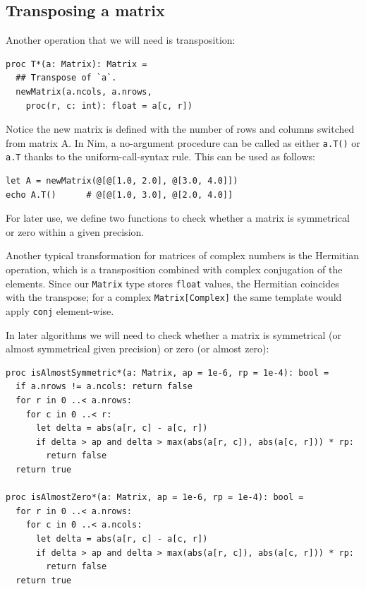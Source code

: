 \documentclass[justified, sixbynine]{tufte-book}
\def\ft{\small\tt}
\theoremstyle{plain}%
\newtheorem * {corollary}{Corollary}
\theoremstyle{definition}
\theoremstyle{remark}
\newtheorem * {remark}{Remark}
\newtheorem * {note}{Note}
\begin{document}
\begin{fullwidth}
\goodbreak\subsection{Transposing a matrix}


Another operation that we will need is transposition:

\begin{lstlisting}[caption={in file: {\ft nlib/matrix.nim}}]
proc T*(a: Matrix): Matrix =
  ## Transpose of `a`.
  newMatrix(a.ncols, a.nrows,
    proc(r, c: int): float = a[c, r])
\end{lstlisting}

Notice the new matrix is defined with the number of rows and columns switched from matrix A. In Nim, a no-argument procedure can be called as either {\ft a.T()} or {\ft a.T} thanks to the uniform-call-syntax rule.
This can be used as follows:

\begin{lstlisting}
let A = newMatrix(@[@[1.0, 2.0], @[3.0, 4.0]])
echo A.T()      # @[@[1.0, 3.0], @[2.0, 4.0]]
\end{lstlisting}

For later use, we define two functions to check whether a matrix is symmetrical or zero within a given precision.

Another typical transformation for matrices of complex numbers is the Hermitian operation, which is a transposition combined with complex conjugation of the elements. Since our {\ft Matrix} type stores {\ft float} values, the Hermitian coincides with the transpose; for a complex {\ft Matrix[Complex]} the same template would apply {\ft conj} element-wise.


In later algorithms we will need to check whether a matrix is symmetrical (or almost symmetrical given precision) or zero (or almost zero):

\begin{lstlisting}[caption={in file: {\ft nlib/matrix.nim}}]
proc isAlmostSymmetric*(a: Matrix, ap = 1e-6, rp = 1e-4): bool =
  if a.nrows != a.ncols: return false
  for r in 0 ..< a.nrows:
    for c in 0 ..< r:
      let delta = abs(a[r, c] - a[c, r])
      if delta > ap and delta > max(abs(a[r, c]), abs(a[c, r])) * rp:
        return false
  return true

proc isAlmostZero*(a: Matrix, ap = 1e-6, rp = 1e-4): bool =
  for r in 0 ..< a.nrows:
    for c in 0 ..< a.ncols:
      let delta = abs(a[r, c] - a[c, r])
      if delta > ap and delta > max(abs(a[r, c]), abs(a[c, r])) * rp:
        return false
  return true
\end{lstlisting}


\end{fullwidth}
\end{document}
